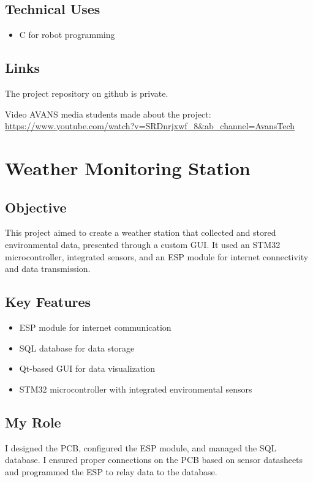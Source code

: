 \documentclass{article}
\begin{document}
\subsection{Technical Uses}
\begin{itemize}
    \item C for robot programming
\end{itemize}

\subsection{Links}
The project repository on github is private.

Video AVANS media students made about the project:
\url{https://www.youtube.com/watch?v=SRDnrjxwf_8&ab_channel=AvansTech}

\section{Weather Monitoring Station}
\subsection{Objective}
This project aimed to create a weather station that collected and stored environmental data, presented through a custom GUI. It used an STM32 microcontroller, integrated sensors, and an ESP module for internet connectivity and data transmission.

\subsection{Key Features}
\begin{itemize}
    \item ESP module for internet communication
    \item SQL database for data storage
    \item Qt-based GUI for data visualization
    \item STM32 microcontroller with integrated environmental sensors
\end{itemize}

\subsection{My Role}
I designed the PCB, configured the ESP module, and managed the SQL database. I ensured proper connections on the PCB based on sensor datasheets and programmed the ESP to relay data to the database.
\end{document}
